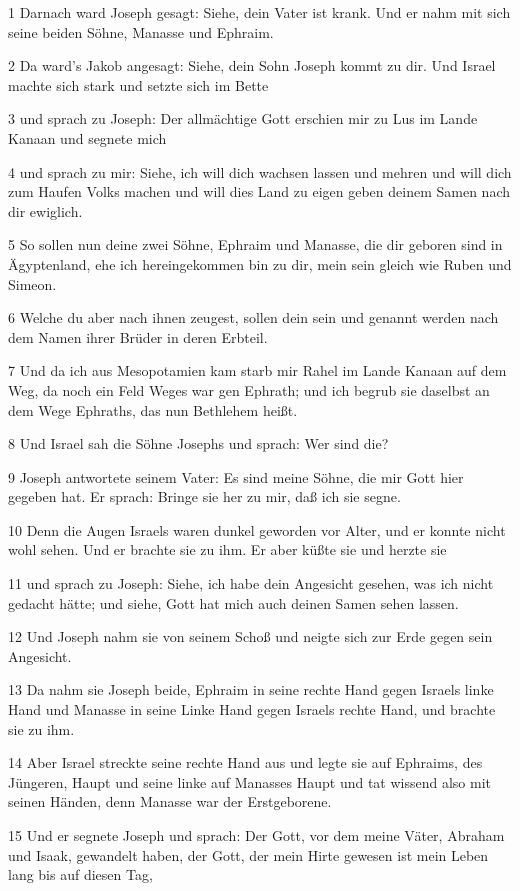 \par 1 Darnach ward Joseph gesagt: Siehe, dein Vater ist krank. Und er nahm mit sich seine beiden Söhne, Manasse und Ephraim.
\par 2 Da ward's Jakob angesagt: Siehe, dein Sohn Joseph kommt zu dir. Und Israel machte sich stark und setzte sich im Bette
\par 3 und sprach zu Joseph: Der allmächtige Gott erschien mir zu Lus im Lande Kanaan und segnete mich
\par 4 und sprach zu mir: Siehe, ich will dich wachsen lassen und mehren und will dich zum Haufen Volks machen und will dies Land zu eigen geben deinem Samen nach dir ewiglich.
\par 5 So sollen nun deine zwei Söhne, Ephraim und Manasse, die dir geboren sind in Ägyptenland, ehe ich hereingekommen bin zu dir, mein sein gleich wie Ruben und Simeon.
\par 6 Welche du aber nach ihnen zeugest, sollen dein sein und genannt werden nach dem Namen ihrer Brüder in deren Erbteil.
\par 7 Und da ich aus Mesopotamien kam starb mir Rahel im Lande Kanaan auf dem Weg, da noch ein Feld Weges war gen Ephrath; und ich begrub sie daselbst an dem Wege Ephraths, das nun Bethlehem heißt.
\par 8 Und Israel sah die Söhne Josephs und sprach: Wer sind die?
\par 9 Joseph antwortete seinem Vater: Es sind meine Söhne, die mir Gott hier gegeben hat. Er sprach: Bringe sie her zu mir, daß ich sie segne.
\par 10 Denn die Augen Israels waren dunkel geworden vor Alter, und er konnte nicht wohl sehen. Und er brachte sie zu ihm. Er aber küßte sie und herzte sie
\par 11 und sprach zu Joseph: Siehe, ich habe dein Angesicht gesehen, was ich nicht gedacht hätte; und siehe, Gott hat mich auch deinen Samen sehen lassen.
\par 12 Und Joseph nahm sie von seinem Schoß und neigte sich zur Erde gegen sein Angesicht.
\par 13 Da nahm sie Joseph beide, Ephraim in seine rechte Hand gegen Israels linke Hand und Manasse in seine Linke Hand gegen Israels rechte Hand, und brachte sie zu ihm.
\par 14 Aber Israel streckte seine rechte Hand aus und legte sie auf Ephraims, des Jüngeren, Haupt und seine linke auf Manasses Haupt und tat wissend also mit seinen Händen, denn Manasse war der Erstgeborene.
\par 15 Und er segnete Joseph und sprach: Der Gott, vor dem meine Väter, Abraham und Isaak, gewandelt haben, der Gott, der mein Hirte gewesen ist mein Leben lang bis auf diesen Tag,
